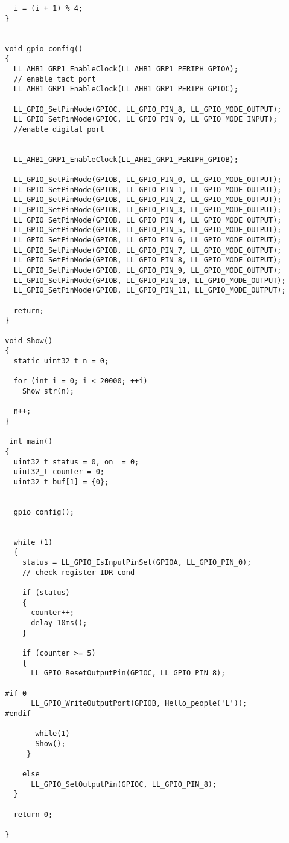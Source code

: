 \begin{verbatim}
    i = (i + 1) % 4;
  }
  
  
  void gpio_config()
  {  
    LL_AHB1_GRP1_EnableClock(LL_AHB1_GRP1_PERIPH_GPIOA); 
    // enable tact port
    LL_AHB1_GRP1_EnableClock(LL_AHB1_GRP1_PERIPH_GPIOC);
    
    LL_GPIO_SetPinMode(GPIOC, LL_GPIO_PIN_8, LL_GPIO_MODE_OUTPUT);
    LL_GPIO_SetPinMode(GPIOC, LL_GPIO_PIN_0, LL_GPIO_MODE_INPUT); 
    //enable digital port
  
    
    LL_AHB1_GRP1_EnableClock(LL_AHB1_GRP1_PERIPH_GPIOB);
      
    LL_GPIO_SetPinMode(GPIOB, LL_GPIO_PIN_0, LL_GPIO_MODE_OUTPUT);
    LL_GPIO_SetPinMode(GPIOB, LL_GPIO_PIN_1, LL_GPIO_MODE_OUTPUT);
    LL_GPIO_SetPinMode(GPIOB, LL_GPIO_PIN_2, LL_GPIO_MODE_OUTPUT);
    LL_GPIO_SetPinMode(GPIOB, LL_GPIO_PIN_3, LL_GPIO_MODE_OUTPUT);
    LL_GPIO_SetPinMode(GPIOB, LL_GPIO_PIN_4, LL_GPIO_MODE_OUTPUT);
    LL_GPIO_SetPinMode(GPIOB, LL_GPIO_PIN_5, LL_GPIO_MODE_OUTPUT);
    LL_GPIO_SetPinMode(GPIOB, LL_GPIO_PIN_6, LL_GPIO_MODE_OUTPUT);
    LL_GPIO_SetPinMode(GPIOB, LL_GPIO_PIN_7, LL_GPIO_MODE_OUTPUT);
    LL_GPIO_SetPinMode(GPIOB, LL_GPIO_PIN_8, LL_GPIO_MODE_OUTPUT);
    LL_GPIO_SetPinMode(GPIOB, LL_GPIO_PIN_9, LL_GPIO_MODE_OUTPUT);
    LL_GPIO_SetPinMode(GPIOB, LL_GPIO_PIN_10, LL_GPIO_MODE_OUTPUT);
    LL_GPIO_SetPinMode(GPIOB, LL_GPIO_PIN_11, LL_GPIO_MODE_OUTPUT);
  
    return;
  }
  
  void Show()
  {
    static uint32_t n = 0;
    
    for (int i = 0; i < 20000; ++i)
      Show_str(n);
    
    n++;
  }
  
   int main()
  {
    uint32_t status = 0, on_ = 0;
    uint32_t counter = 0;
    uint32_t buf[1] = {0};
  
    
    gpio_config();
  
    
    while (1)
    {
      status = LL_GPIO_IsInputPinSet(GPIOA, LL_GPIO_PIN_0); 
      // check register IDR cond
   
      if (status)
      {
        counter++; 
        delay_10ms();
      }
          
      if (counter >= 5)
      {
        LL_GPIO_ResetOutputPin(GPIOC, LL_GPIO_PIN_8);
          
  #if 0
        LL_GPIO_WriteOutputPort(GPIOB, Hello_people('L'));
  #endif
          
         while(1)
         Show();
       }
     
      else
        LL_GPIO_SetOutputPin(GPIOC, LL_GPIO_PIN_8);
    } 
    
    return 0;
  
  }
  
  
  \end{verbatim}
  